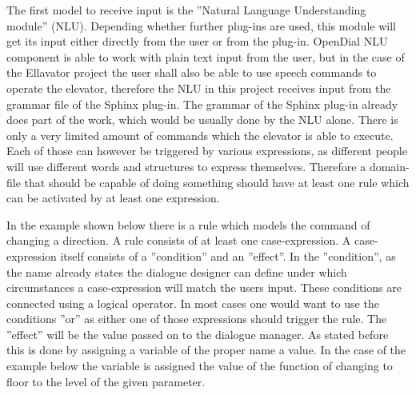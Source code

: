 \documentclass[a4paper, 12pt]{article}
\begin{document}
The first model to receive input is the ”Natural Language Understanding module” (NLU).
Depending whether further plug-ins are used, this module will get its input either directly from the user or from the plug-in.
OpenDial NLU component is able to work with plain text input from the user, but in the case of the Ellavator project the user shall also be able to use speech commands to operate the elevator, therefore the NLU in this project receives input from the grammar file of the Sphinx plug-in.
The grammar of the Sphinx plug-in already does part of the work, which would be usually done by the NLU alone.
There is only a very limited amount of commands which the elevator is able to execute.
Each of those can however be triggered by various expressions, as different people will use different words and structures to express themselves.
Therefore a domain-file that should be capable of doing something should have at least one rule which can be activated by at least one expression. \newline


In the example shown below there is a rule which models the command of changing a direction.
A rule consists of at least one case-expression.
A case-expression itself consists of a ”condition” and an ”effect”.
 In the ”condition”, as the name already states the dialogue designer can define under which circumstances a case-expression will match the users input.
 These conditions are connected using a logical operator.
 In most cases one would want to use the conditions ”or” as either one of those expressions should trigger the rule.
 The ”effect” will be the value passed on to the dialogue manager.
 As stated before this is done by assigning a variable of the proper name a value.
 In the case of the example below the variable is assigned the value of the function of changing to floor to the level of the given parameter.
\end{document}
